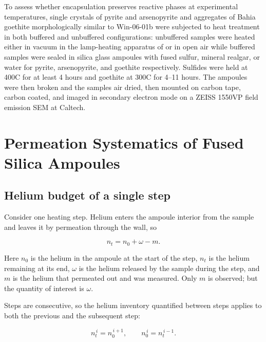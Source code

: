 To assess whether encapsulation preserves reactive phases at experimental temperatures, single crystals of pyrite and arsenopyrite and aggregates of Bahia goethite morphologically similar to Win-06-01b \citep{shustervasconcelos2005,monteiro2017} were subjected to heat treatment in both buffered and unbuffered configurations: unbuffered samples were heated either in vacuum in the lamp-heating apparatus of \citet{farley1999} or in open air while buffered samples were sealed in silica glass ampoules with fused sulfur, mineral realgar, or water for pyrite, arsenopyrite, and goethite respectively. Sulfides were held at 400\textdegree C for at least 4 hours and goethite at 300\textdegree C for 4--11 hours. The ampoules were then broken and the samples air dried, then mounted on carbon tape, carbon coated, and imaged in secondary electron mode on a ZEISS 1550VP field emission SEM at Caltech.

\section{Permeation Systematics of Fused Silica Ampoules}\label{sec:theory}

\subsection{Helium budget of a single step}\label{sec:budget}

Consider one heating step. Helium enters the ampoule interior from the sample and leaves it by permeation through the wall, so

\begin{equation}
\label{eq:permlag}
n_{t} = n_{0} + \omega - m .
\end{equation}

Here $n_{0}$ is the helium in the ampoule at the start of the step, $n_{t}$ is the helium remaining at its end, $\omega$ is the helium released by the sample during the step, and $m$ is the helium that permeated out and was measured. Only $m$ is observed; but the quantity of interest is $\omega$.

Steps are consecutive, so the helium inventory quantified between steps applies to both the previous and the subsequent step:

\begin{equation}
\label{eq:carry}
n_{t}^{\,i} = n_{0}^{\,i+1}, \qquad n_{0}^{\,i} = n_{t}^{\,i-1} .
\end{equation}

